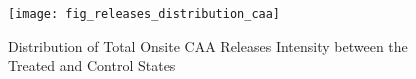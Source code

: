 \begin{figure}[H]
    \centering
    \texttt{[image: fig\_releases\_distribution\_caa]}
    \caption{Distribution of Total Onsite CAA Releases Intensity between the Treated and Control States}
    \label{fig:releases-distribution-caa}
\end{figure}